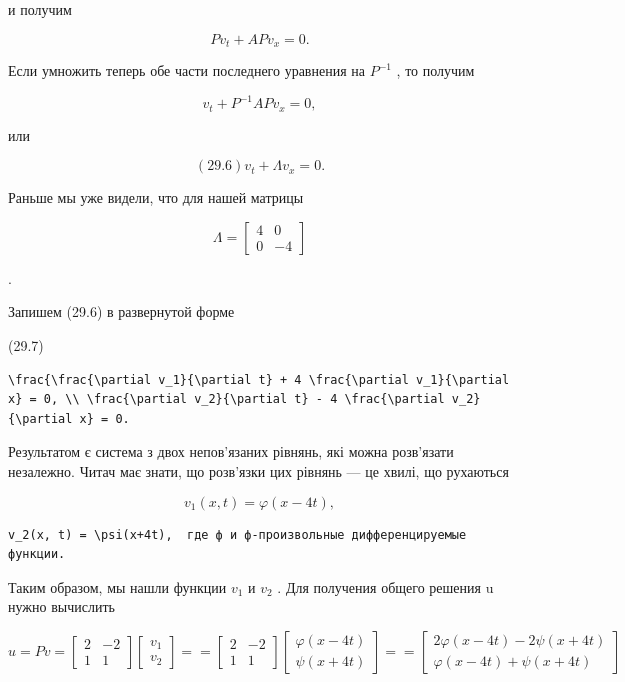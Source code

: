 \documentclass[
  ukrainian,
]{article}
\begin{document}
и получим

\[
Pv_t + APv_x = 0.
\]

Если умножить теперь обе части последнего уравнения на \(P^{-1}\) , то
получим

\[
v_t + P^{-1}APv_x = 0,
\]

или

\[
(29.6) v_t + \Lambda v_x = 0.
\]

Раньше мы уже видели, что для нашей матрицы

\[
\Lambda =
\begin{bmatrix} 4 & 0 \\ 0 & -4 \end{bmatrix}
\]

.

Запишем (29.6) в развернутой форме

(29.7)

\begin{verbatim}
\frac{\frac{\partial v_1}{\partial t} + 4 \frac{\partial v_1}{\partial x} = 0, \\ \frac{\partial v_2}{\partial t} - 4 \frac{\partial v_2}{\partial x} = 0.
\end{verbatim}

Результатом є система з двох непов'язаних рівнянь, які можна розв'язати
незалежно. Читач має знати, що розв'язки цих рівнянь --- це хвилі, що
рухаються

\[
v_1(x, t) = \varphi(x-4t),
\]

\begin{verbatim}
v_2(x, t) = \psi(x+4t),  где ф и ф-произвольные дифференцируемые функции.
\end{verbatim}

Таким образом, мы нашли функции \(v_1\) и \(v_2\) . Для получения общего
решения u нужно вычислить

\[
u = Pv =
\begin{bmatrix} 2 & -2 \\ 1 & 1 \end{bmatrix}
\begin{bmatrix} v_1 \\ v_2 \end{bmatrix}
=
=
\begin{bmatrix} 2 & -2 \\ 1 & 1 \end{bmatrix}
\begin{bmatrix} \varphi(x - 4t) \\ \psi(x + 4t) \end{bmatrix}
=
=
\begin{bmatrix} 2\varphi(x - 4t) - 2\psi(x + 4t) \\ \varphi(x - 4t) + \psi(x + 4t) \end{bmatrix}
\]
\end{document}
